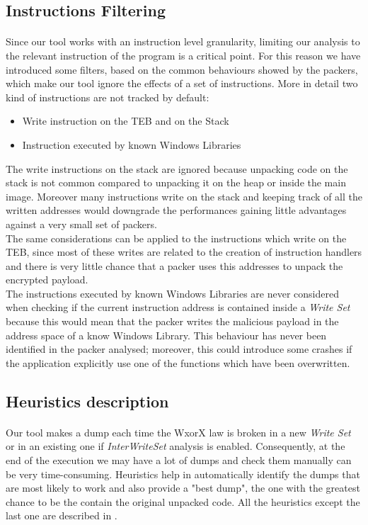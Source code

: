 \subsection{Instructions Filtering}
\paragraph{}
Since our tool works with an instruction level granularity, limiting our analysis to the relevant instruction of the program is a critical point. For this reason we have introduced some filters, based on the common behaviours showed by the packers, which make our tool ignore the effects of a set of instructions. More in detail two kind of instructions are not tracked by default:
\begin{itemize}
	\item Write instruction on the TEB and on the Stack
	\item Instruction executed by known Windows Libraries
\end{itemize}
The write instructions on the stack are ignored because unpacking code on the stack is not common compared to unpacking it on the heap or inside the main image. Moreover many instructions write on the stack and keeping track of all the written addresses would downgrade the performances gaining little advantages against a very small set of packers.\\
The same considerations can be applied to the instructions which write on the TEB, since most of these writes are related to the creation of instruction handlers and there is very little chance that a packer uses this addresses to unpack the encrypted payload.\\
The instructions executed by known Windows Libraries are never considered when checking if the current instruction address is contained inside a \textit{Write Set} because this would mean that the packer writes the malicious payload in the address space of a know Windows Library. This behaviour has never been identified in the packer analysed; moreover, this could introduce some crashes if the application explicitly use one of the functions which have been overwritten.

\subsection{Heuristics description}
\paragraph{}
Our tool makes a dump each time the WxorX law is broken in a new \textit{Write Set} or in an existing one if \textit{InterWriteSet} analysis is enabled. Consequently, at the end of the execution we may have a lot of dumps and check them manually can be very time-consuming. Heuristics help in automatically identify the dumps that are most likely to work and also provide a "best dump", the one with the greatest chance to be the contain the original unpacked code. All the heuristics except the last one are described in \cite{Practical_Malware_Analysis}.
